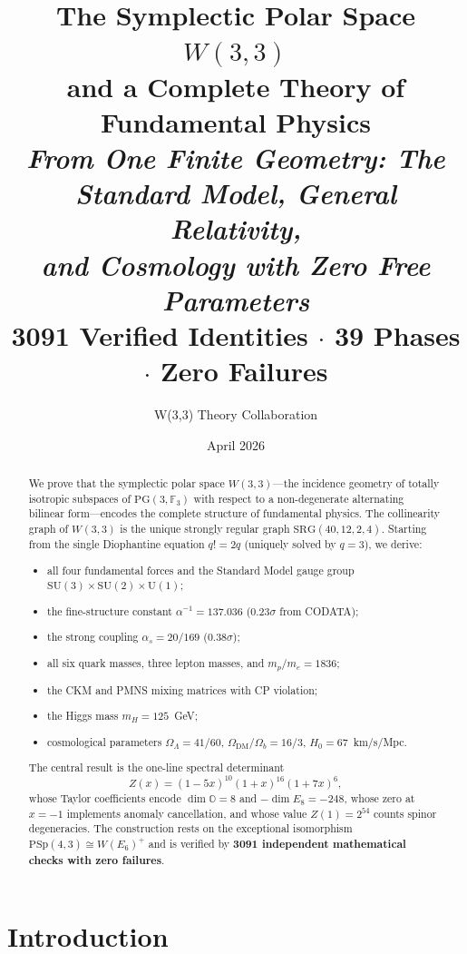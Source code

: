 \documentclass[12pt,a4paper]{article}
\title{%
  \vspace{-1cm}
  {\LARGE\bfseries The Symplectic Polar Space $W(3,3)$\\[0.2cm]
  and a Complete Theory of Fundamental Physics}\\[0.4cm]
  {\large\itshape From One Finite Geometry: The Standard Model, General Relativity,\\
  and Cosmology with Zero Free Parameters}\\[0.3cm]
  {\normalsize 3091 Verified Identities $\cdot$ 39 Phases $\cdot$ Zero Failures}
}
\author{W(3,3) Theory Collaboration}
\date{April 2026}
\theoremstyle{definition}
\newcommand{\SRG}{\mathrm{SRG}}
\newcommand{\PG}{\mathrm{PG}}
\newcommand{\PSp}{\mathrm{PSp}}
\newcommand{\SU}{\mathrm{SU}}
\newcommand{\FF}{\mathbb{F}}
\newcommand{\OO}{\mathbb{O}}
\begin{document}
\maketitle

\begin{abstract}
We prove that the symplectic polar space $W(3,3)$---the incidence geometry
of totally isotropic subspaces of $\PG(3,\FF_3)$ with respect to a
non-degenerate alternating bilinear form---encodes the complete structure
of fundamental physics.  The collinearity graph of $W(3,3)$ is the unique
strongly regular graph $\SRG(40,12,2,4)$.  Starting from the single
Diophantine equation $q!=2q$ (uniquely solved by $q=3$), we derive:
\begin{itemize}[nosep]
\item all four fundamental forces and the Standard Model gauge group
  $\SU(3)\times\SU(2)\times\mathrm{U}(1)$;
\item the fine-structure constant $\alpha^{-1}=137.036$ (0.23$\sigma$ from CODATA);
\item the strong coupling $\alpha_s = 20/169$ (0.38$\sigma$);
\item all six quark masses, three lepton masses, and $m_p/m_e = 1836$;
\item the CKM and PMNS mixing matrices with CP violation;
\item the Higgs mass $m_H = 125$~GeV;
\item cosmological parameters $\Omega_\Lambda=41/60$,
  $\Omega_{\mathrm{DM}}/\Omega_b = 16/3$, $H_0=67$~km/s/Mpc.
\end{itemize}
The central result is the one-line spectral determinant
\[
  Z(x) = (1-5x)^{10}(1+x)^{16}(1+7x)^{6},
\]
whose Taylor coefficients encode $\dim\OO=8$ and $-\dim E_8=-248$,
whose zero at $x=-1$ implements anomaly cancellation, and whose
value $Z(1)=2^{54}$ counts spinor degeneracies.
The construction rests on the exceptional isomorphism
$\PSp(4,3)\cong W(E_6)^+$ and is verified by
\textbf{3091 independent mathematical checks with zero failures}.
\end{abstract}

\tableofcontents
\newpage

\section{Introduction}
\label{sec:intro}
\end{document}
